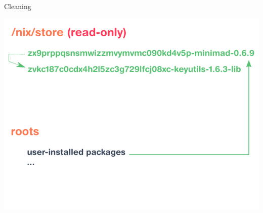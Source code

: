 \documentclass[aspectratio=169]{beamer}
\begin{document}
\begin{frame}{Cleaning}
{\begin{center}
            \includegraphics[height=0.98\textheight]{img/schema-nix-store-gc-v2-6.pdf}
        \end{center}
    }

\end{frame}
\end{document}

